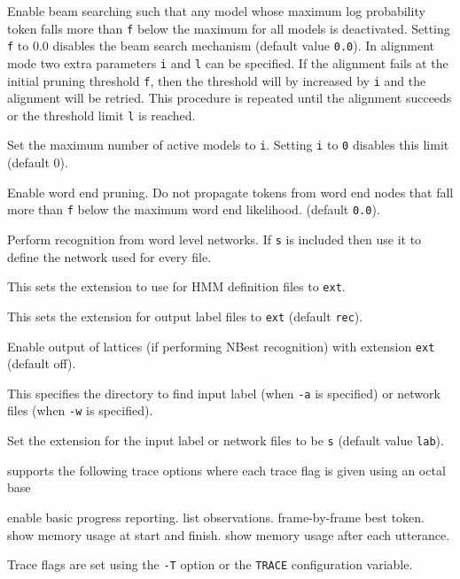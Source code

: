 \begin{optlist}
   Enable beam searching such that any model whose 
        maximum log probability token falls more than \texttt{f} below
        the maximum for all models is deactivated.  Setting \texttt{f}
        to 0.0 disables the beam search mechanism (default value
        \texttt{0.0}). In alignment mode two extra parameters
        \texttt{i} and \texttt{l} can be specified. If the alignment
        fails at the initial pruning threshold \texttt{f}, then the
        threshold will by increased by \texttt{i} and the alignment
        will be retried. This procedure is repeated until the
        alignment succeeds or the threshold limit \texttt{l} is
        reached.        

   Set the maximum number of active models to \texttt{i}.
        Setting \texttt{i} to \texttt{0} disables this limit (default 0).

   Enable word end pruning.  Do not propagate tokens from
        word end nodes that fall more than \texttt{f} below the maximum 
        word end likelihood.  (default \texttt{0.0}).

   Perform recognition from word level networks.  If
        \texttt{s} is included then use it to define the network used
        for every file.

    This sets the extension to use for HMM definition
      files to \texttt{ext}.

    This sets the extension for output label files to
        \texttt{ext} (default \texttt{rec}).

    Enable output of lattices (if performing NBest
        recognition) with extension \texttt{ext} (default off).

   This specifies the directory to find input label (when
        \texttt{-a} is specified) or network files (when \texttt{-w} is
        specified).

   Set the extension for the input label or network files 
        to be \texttt{s}  (default value \texttt{lab}).

\stdoptF
\stdoptG
\stdoptH
\stdoptI
\stdoptJ
\stdoptK
\stdoptP

\end{optlist}


 supports the following trace options where each
trace flag is given using an octal base
\begin{optlist}
    enable basic progress reporting.  
    list observations.
    frame-by-frame best token.
    show memory usage at start and finish.
    show memory usage after each utterance.
\end{optlist}
Trace flags are set using the \texttt{-T} option or the \texttt{TRACE} 
configuration variable.


